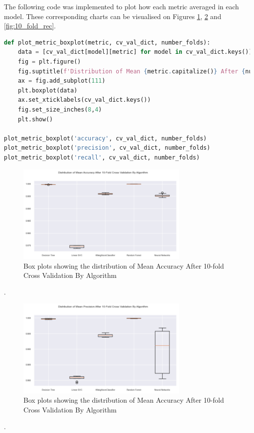 \documentclass{article}
\begin{document}
The following code was implemented to plot how each metric averaged in each model. These corresponding charts can be visualised on Figures \ref{fig:10_fold_acc}, \ref{fig:10_fold_prec} and \ref{fig:10_fold_rec}.

\begin{lstlisting}[language=Python]
def plot_metric_boxplot(metric, cv_val_dict, number_folds):
    data = [cv_val_dict[model][metric] for model in cv_val_dict.keys()]
    fig = plt.figure()
    fig.suptitle(f'Distribution of Mean {metric.capitalize()} After {number_folds}-Fold Cross Validation By Algorithm')
    ax = fig.add_subplot(111)
    plt.boxplot(data)
    ax.set_xticklabels(cv_val_dict.keys())
    fig.set_size_inches(8,4)
    plt.show()

plot_metric_boxplot('accuracy', cv_val_dict, number_folds)
plot_metric_boxplot('precision', cv_val_dict, number_folds)
plot_metric_boxplot('recall', cv_val_dict, number_folds)
\end{lstlisting}

\begin{figure}
\centering
\includegraphics[width=0.75\textwidth]{10_fold_acc.png}
\caption{\label{fig:10_fold_acc}Box plots showing the distribution of Mean Accuracy After 10-fold Cross Validation By Algorithm}
\end{figure}.

\begin{figure}
\centering
\includegraphics[width=0.75\textwidth]{10_fold_prec.png}
\caption{\label{fig:10_fold_prec}Box plots showing the distribution of Mean Accuracy After 10-fold Cross Validation By Algorithm}
\end{figure}.
\end{document}
